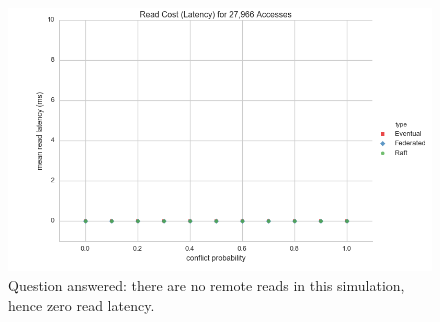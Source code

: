 \documentclass[11pt,letterpaper]{article}
\begin{document}
\begin{figure}[!h]
    \centering
        \includegraphics[width=\textwidth]{figures/read_latency.png}
        \caption{\textsf{Question answered: there are no remote reads in this simulation, hence zero read latency.}}
        \label{fig:read_latency}
\end{figure}
\end{document}
